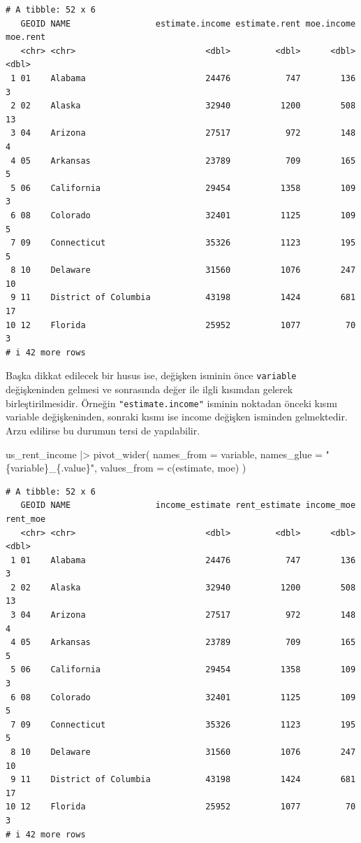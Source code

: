 \documentclass[
  letterpaper,
  DIV=11,
  numbers=noendperiod]{scrreprt}
\newenvironment{Shaded}{\begin{snugshade}}{\end{snugshade}}
\newcommand{\AttributeTok}[1]{\textcolor[rgb]{0.40,0.45,0.13}{#1}}
\newcommand{\FunctionTok}[1]{\textcolor[rgb]{0.28,0.35,0.67}{#1}}
\newcommand{\NormalTok}[1]{\textcolor[rgb]{0.00,0.23,0.31}{#1}}
\newcommand{\SpecialCharTok}[1]{\textcolor[rgb]{0.37,0.37,0.37}{#1}}
\newcommand{\StringTok}[1]{\textcolor[rgb]{0.13,0.47,0.30}{#1}}
\begin{document}
\begin{verbatim}
# A tibble: 52 x 6
   GEOID NAME                 estimate.income estimate.rent moe.income moe.rent
   <chr> <chr>                          <dbl>         <dbl>      <dbl>    <dbl>
 1 01    Alabama                        24476           747        136        3
 2 02    Alaska                         32940          1200        508       13
 3 04    Arizona                        27517           972        148        4
 4 05    Arkansas                       23789           709        165        5
 5 06    California                     29454          1358        109        3
 6 08    Colorado                       32401          1125        109        5
 7 09    Connecticut                    35326          1123        195        5
 8 10    Delaware                       31560          1076        247       10
 9 11    District of Columbia           43198          1424        681       17
10 12    Florida                        25952          1077         70        3
# i 42 more rows
\end{verbatim}

Başka dikkat edilecek bir husus ise, değişken isminin önce
\texttt{variable} değişkeninden gelmesi ve sonrasında değer ile ilgli
kısımdan gelerek birleştirilmesidir. Örneğin \texttt{"estimate.income"}
isminin noktadan önceki kısmı variable değişkeninden, sonraki kısmı ise
income değişken isminden gelmektedir. Arzu edilirse bu durumun tersi de
yapılabilir.

\begin{Shaded}
\begin{Highlighting}[]
\NormalTok{us\_rent\_income }\SpecialCharTok{|\textgreater{}} 
  \FunctionTok{pivot\_wider}\NormalTok{(}
    \AttributeTok{names\_from =}\NormalTok{ variable,}
    \AttributeTok{names\_glue =} \StringTok{"\{variable\}\_\{.value\}"}\NormalTok{,}
    \AttributeTok{values\_from =} \FunctionTok{c}\NormalTok{(estimate, moe)}
\NormalTok{  )}
\end{Highlighting}
\end{Shaded}

\begin{verbatim}
# A tibble: 52 x 6
   GEOID NAME                 income_estimate rent_estimate income_moe rent_moe
   <chr> <chr>                          <dbl>         <dbl>      <dbl>    <dbl>
 1 01    Alabama                        24476           747        136        3
 2 02    Alaska                         32940          1200        508       13
 3 04    Arizona                        27517           972        148        4
 4 05    Arkansas                       23789           709        165        5
 5 06    California                     29454          1358        109        3
 6 08    Colorado                       32401          1125        109        5
 7 09    Connecticut                    35326          1123        195        5
 8 10    Delaware                       31560          1076        247       10
 9 11    District of Columbia           43198          1424        681       17
10 12    Florida                        25952          1077         70        3
# i 42 more rows
\end{verbatim}
\end{document}
